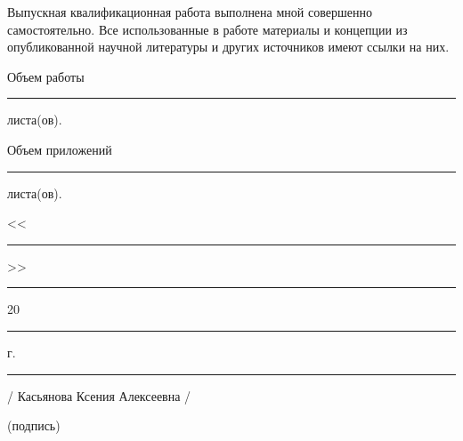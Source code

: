 \documentclass[12pt,a4paper, oneside]{extreport}
\begin{document}
\thispagestyle{empty}

Выпускная квалификационная работа выполнена мной совершенно самостоятельно. Все использованные в работе материалы и концепции из опубликованной научной литературы и других источников имеют ссылки на них.

\vspace{2ex}

 Объем работы  \rule{2em}{0.5pt} листа(ов).

\vspace{2ex}

 Объем приложений \rule{2em}{0.5pt} листа(ов).

\vspace{4ex}

\noindent << \rule{1em}{0.5pt} >> \rule{5em}{0.5pt} 20 \rule{1.4em}{0.5pt} г. 

\vspace{4ex}



\noindent \rule{11em}{0.5pt} 
\hspace{8em} / Касьянова Ксения Алексеевна /

\hspace{5ex} \footnotesize (подпись)


\end{document}

